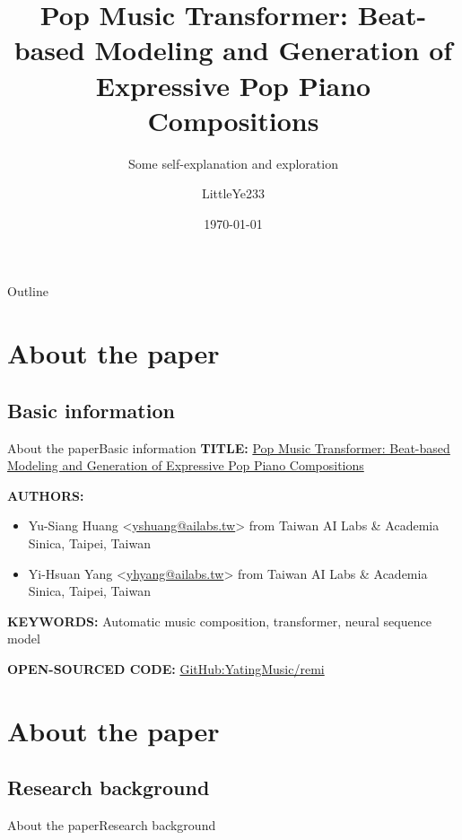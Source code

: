 \documentclass{beamer}
\title{Pop Music Transformer: Beat-based Modeling and Generation of Expressive Pop Piano Compositions}
\subtitle{Some self-explanation and exploration}
\author{LittleYe233}
\institute{LittleYe233 Workgroup}
\date{\today}
\newcommand{\thiss}{}
\newcommand{\thisss}{}
\begin{document}
\begin{frame}
    \titlepage
\end{frame}

\begin{frame}{Outline}
    \tableofcontents
\end{frame}


\renewcommand{\thiss}{About the paper}
\renewcommand{\thisss}{Basic information}
\section{\thiss}
\subsection{\thisss}
\begin{frame}{\thiss}{\thisss}
    \textbf{TITLE:} \href{https://arxiv.org/abs/2002.00212}{Pop Music Transformer: Beat-based Modeling and Generation of Expressive Pop Piano Compositions}

    \textbf{AUTHORS:}
    \begin{itemize}
        \item Yu-Siang Huang <\href{mailto:yshuang@ailabs.tw}{yshuang@ailabs.tw}> from Taiwan AI Labs \& Academia Sinica, Taipei, Taiwan
        \item Yi-Hsuan Yang <\href{mailto:yhyang@ailabs.tw}{yhyang@ailabs.tw}> from Taiwan AI Labs \& Academia Sinica, Taipei, Taiwan
    \end{itemize}
    
    \textbf{KEYWORDS:} Automatic music composition, transformer, neural sequence model

    \textbf{OPEN-SOURCED CODE:} \href{https://arxiv.org/abs/2002.00212}{GitHub:YatingMusic/remi}
\end{frame}

\renewcommand{\thisss}{Research background}
\section{\thiss}
\subsection{\thisss}
\begin{frame}{\thiss}{\thisss}
    
\end{frame}
\end{document}
